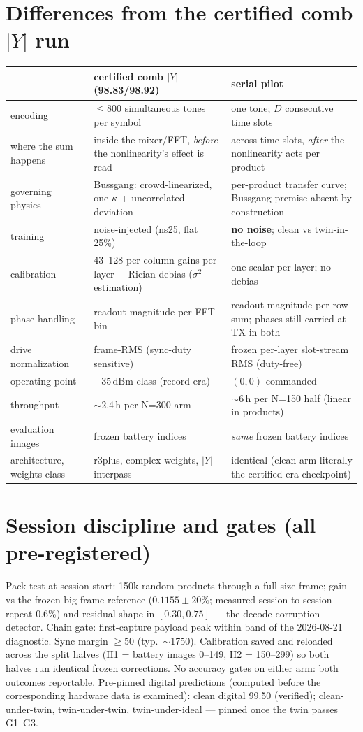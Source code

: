 \documentclass[11pt]{article}
\newcommand{\dbm}{\ensuremath{\,\mathrm{dBm}}}
\begin{document}
\section{Differences from the certified comb $|Y|$ run}
\begin{center}\small
\begin{tabular}{p{3.4cm}p{5.2cm}p{5.2cm}}
\toprule
& certified comb $|Y|$ (98.83/98.92) & serial pilot\\
\midrule
encoding & $\le$800 simultaneous tones per symbol & one tone; $D$
consecutive time slots\\
where the sum happens & inside the mixer/FFT, \emph{before} the
nonlinearity's effect is read & across time slots, \emph{after} the
nonlinearity acts per product\\
governing physics & Bussgang: crowd-linearized, one $\kappa$ +
uncorrelated deviation & per-product transfer curve; Bussgang premise
absent by construction\\
training & noise-injected (ns25, flat 25\%) & \textbf{no noise};
clean vs twin-in-the-loop\\
calibration & 43--128 per-column gains per layer + Rician debias
($\sigma^2$ estimation) & one scalar per layer; no debias\\
phase handling & readout magnitude per FFT bin & readout magnitude
per row sum; phases still carried at TX in both\\
drive normalization & frame-RMS (sync-duty sensitive) & frozen
per-layer slot-stream RMS (duty-free)\\
operating point & $-35$\dbm-class (record era) & $(0,0)$ commanded\\
throughput & $\sim$2.4\,h per N=300 arm & $\sim$6\,h per N=150 half
(linear in products)\\
evaluation images & frozen battery indices & \emph{same} frozen
battery indices\\
architecture, weights class & r3plus, complex weights, $|Y|$
interpass & identical (clean arm literally the certified-era
checkpoint)\\
\bottomrule
\end{tabular}
\end{center}

\section{Session discipline and gates (all pre-registered)}
Pack-test at session start: 150k random products through a full-size
frame; gain vs the frozen big-frame reference ($0.1155\pm20\%$;
measured session-to-session repeat 0.6\%) and residual shape in
$[0.30, 0.75]$ --- the decode-corruption detector. Chain gate:
first-capture payload peak within band of the 2026-08-21 diagnostic.
Sync margin $\ge 50$ (typ.\ $\sim$1750). Calibration saved and
reloaded across the split halves (H1 = battery images 0--149, H2 =
150--299) so both halves run identical frozen corrections. No
accuracy gates on either arm: both outcomes reportable. Pre-pinned
digital predictions (computed before the corresponding hardware
data is examined): clean digital 99.50 (verified); clean-under-twin,
twin-under-twin, twin-under-ideal --- pinned once the twin passes
G1--G3.
\end{document}
